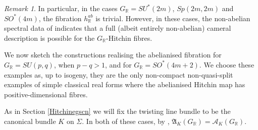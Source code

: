 \documentclass{amsart}
\theoremstyle{remark}
\newtheorem{remark}[theorem]{Remark}
\numberwithin{theorem}{section}
\numberwithin{equation}{section}
\begin{document}
\begin{remark}\label{InnerSplitFormrmk}
    In particular, in the cases $G_\mathbb{R} = SU^*(2m)$, $Sp(2m,2m)$ and $SO^*(4m)$, the fibration $h^{ab}_{\mathbb{R}}$ is trivial. However, in these cases, the non-abelian spectral data of \cite{HS} indicates that a full (albeit entirely non-abelian) cameral description is possible for the $G_\mathbb{R}$-Hitchin fibres.
\end{remark}

We now sketch the constructions realising the abelianised fibration for $G_{\mathbb{R}} = SU(p,q)$,  when $p - q>1$, and for $G_{\mathbb{R}}=SO^*(4m+2)$. We choose these examples as, up to isogeny, they are the only non-compact non-quasi-split examples of simple classical real forms where the abelianised Hitchin map has positive-dimensional fibres.

As in Section \ref{Hitchinegscn} we will fix the twisting line bundle to be the canonical bundle $K$ on $\Sigma$. In both of these cases, by \cite[Theorem 1]{Sekiguchi}, $\mathfrak{ A}_K(G_\mathbb{R}) = \mathcal A_K(G_\mathbb{R})$.
\end{document}
